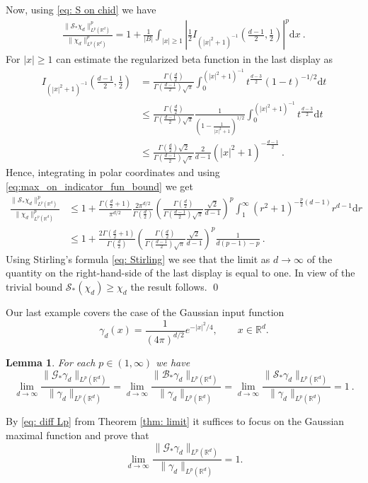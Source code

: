 \documentclass[a4paper, reqno]{amsart}
\newtheorem{lemma}[thm]{Lemma}
\theoremstyle{definition}
\newcommand{\R}{{\mathbb R}}
\newcommand{\dd}{{\mathrm d}}
\newcommand{\mG}{\mathcal{G}}
\newcommand{\mB}{\mathcal{B}}
\newcommand{\mS}{\mathcal{S}}
\begin{document}
Now, using \eqref{eq: S on chid} we have 
\begin{align}\label{eq:max_on_indicator_fun_bound}
    \frac{\|\mathcal{S}_\ast \chi_d\|_{L^p(\R^d)}^p}{\|\chi_d\|_{L^p(\R^d)}^p}= 1 +\frac{1}{|B|}\int_{|x|\geq 1}\left|\frac{1}{2} I_{(|x|^2+1)^{-1}}\left(\frac{d-1}{2},\frac{1}{2}\right)\right|^p \dd x~.
\end{align}
For $|x|\geq 1$ can estimate the regularized beta function in the last display as
\begin{align*}
    I_{(|x|^2+1)^{-1}}\left(\frac{d-1}{2},\frac{1}{2}\right) & =\frac{\Gamma(\tfrac{d}{2})}{\Gamma(\tfrac{d-1}{2})\sqrt{\pi}} \int_0^{(|x|^2+1)^{-1}}t^{\tfrac{d-3}{2}}(1-t)^{-1/2}\dd t\\
    & \leq \frac{\Gamma(\tfrac{d}{2})}{\Gamma(\tfrac{d-1}{2})\sqrt{\pi}} \frac{1}{\left( 1- \tfrac{1}{|x|^2+1}\right)^{1/2}} \int_0^{(|x|^2+1)^{-1}}t^{\tfrac{d-3}{2}}\dd t \\
    & \leq  \frac{\Gamma(\tfrac{d}{2})\sqrt{2}}{\Gamma(\tfrac{d-1}{2})\sqrt{\pi}} \frac{2}{d-1}(|x|^2+1)^{-\tfrac{d-1}{2}}~.
\end{align*}
Hence, integrating in polar coordinates and using \eqref{eq:max_on_indicator_fun_bound} we get
\begin{align*}
     \frac{\|\mathcal{S}_\ast \chi_d\|_{L^p(\R^d)}^p}{\|\chi_d\|_{L^p(\R^d)}^p} & \leq 1 +\frac{\Gamma(\tfrac{d}{2}+1)}{\pi^{d/2}} \frac{2\pi^{d/2}}{\Gamma(\tfrac{d}{2})} \left( \frac{\Gamma(\tfrac{d}{2})}{\Gamma(\tfrac{d-1}{2})\sqrt{\pi}} \frac{\sqrt{2}}{d-1}\right)^p \int_1^\infty (r^2+1)^{-\tfrac{p}{2}(d-1)} r^{d-1}\dd r\\
     & \leq 1 +\frac{2\Gamma(\tfrac{d}{2}+1) }{\Gamma(\tfrac{d}{2})} \left( \frac{\Gamma(\tfrac{d}{2})}{\Gamma(\tfrac{d-1}{2})\sqrt{\pi}} \frac{\sqrt{2}}{d-1}\right)^p\frac{1}{d(p-1)-p}~.
\end{align*}
Using Stirling's formula \eqref{eq: Stirling} we see that the limit as $d\rightarrow\infty$ of the quantity on the right-hand-side of the last display is equal to one. In view of the trivial bound $\mS_*(\chi_d)\ge \chi_d$ the result follows.
\qed

Our last example covers the case of the Gaussian input function
\[
\gamma_{d}(x)=\frac{1}{(4\pi )^{d/2}}e^{-|x|^2/4},\qquad x\in \R^d.
\]
\begin{lemma}
    For each  $p\in(1,\infty)$ we have
     $$\lim_{d\rightarrow\infty}\frac{\|\mG_\ast \gamma_{d}\|_{L^p(\R^d)}}{\|\gamma_{d}\|_{L^p(\R^d)}}=\lim_{d\rightarrow\infty}\frac{\|\mB_\ast \gamma_{d}\|_{L^p(\R^d)}}{\|\gamma_{d}\|_{L^p(\R^d)}}=\lim_{d\rightarrow\infty}\frac{\|\mS_\ast \gamma_{d}\|_{L^p(\R^d)}}{\|\gamma_{d}\|_{L^p(\R^d)}}=1~.$$
\end{lemma}
\proof By \eqref{eq: diff Lp} from Theorem \ref{thm: limit} it suffices to focus on the Gaussian maximal function and prove that
\[
\lim_{d\rightarrow\infty}\frac{\|\mG_\ast \gamma_{d}\|_{L^p(\R^d)}}{\|\gamma_{d}\|_{L^p(\R^d)}}=1.
\]
\end{document}
